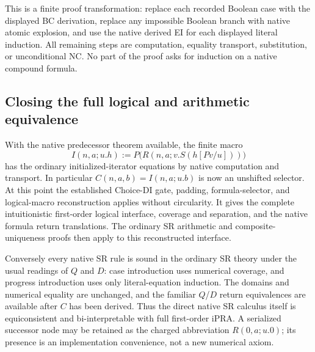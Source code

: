 This is a finite proof transformation: replace each recorded Boolean
case with the displayed BC derivation, replace any impossible Boolean
branch with native atomic explosion, and use the native derived EI
for each displayed literal induction.  All remaining steps are
computation, equality transport, substitution, or unconditional NC.
No part of the proof asks for induction on a native compound formula.

\subsection{Closing the full logical and arithmetic equivalence}

With the native predecessor theorem available, the finite macro
\[
 I(n,a;u.h):=P\bigl(R(n,a;v.S(h[Pv/u]))\bigr)
\]
has the ordinary initialized-iterator equations by native computation
and transport.  In particular $C(n,a,b)=I(n,a;u.b)$ is now an
unshifted selector.  At this point the established Choice-DI gate,
padding, formula-selector, and logical-macro reconstruction applies
without circularity.  It gives the complete intuitionistic first-order
logical interface, coverage and separation, and the native formula
return translations.  The ordinary SR arithmetic and composite-uniqueness
proofs then apply to this reconstructed interface.

Conversely every native SR rule is sound in the ordinary SR theory
under the usual readings of $Q$ and $D$: case introduction uses numerical
coverage, and progress introduction uses only literal-equation induction.
The domains and numerical equality are unchanged, and the familiar
$Q$/$D$ return equivalences are available after $C$ has been derived.
Thus the direct native SR calculus itself is equiconsistent and
bi-interpretable with full first-order iPRA.  A serialized successor
node may be retained as the charged abbreviation $R(0,a;u.0)$; its
presence is an implementation convenience, not a new numerical axiom.
